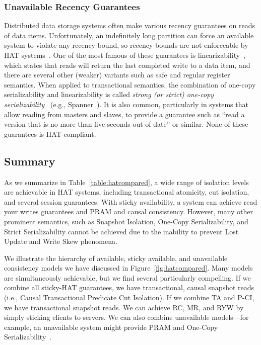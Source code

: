 \subsubsection{Unavailable Recency Guarantees}

Distributed data storage systems often make various recency guarantees
on reads of data items.  Unfortunately, an indefinitely long partition
can force an available system to violate any recency bound, so recency
bounds are not enforceable by HAT systems~\cite{gilbert-cap}. One of
the most famous of these guarantees is
linearizability~\cite{herlihy-art}, which states that reads will
return the last completed write to a data item, and there are several
other (weaker) variants such as safe and regular register
semantics. When applied to transactional semantics, the combination of
one-copy serializability and linearizability is called \textit{strong
  (or strict) one-copy serializability}~\cite{adya} (e.g.,
Spanner~\cite{spanner}). It is also common, particularly in systems
that allow reading from masters and slaves, to provide a guarantee
such as ``read a version that is no more than five seconds out of
date'' or similar. None of these guarantees is HAT-compliant.

\subsection{Summary}
\label{sec:hat-summary}

As we summarize in Table~\ref{table:hatcompared}, a wide range of
isolation levels are achievable in HAT systems, including
transactional atomicity, cut isolation, and several session
guarantees. With sticky availability, a system can achieve read your
writes guarantees and PRAM and causal consistency. However, many other
prominent semantics, such as Snapshot Isolation, One-Copy
Serializability, and Strict Serializability cannot be achieved due to
the inability to prevent Lost Update and Write Skew phenomena.

We illustrate the hierarchy of available, sticky available, and
unavailable consistency models we have discussed in
Figure~\ref{fig:hatcompared}. Many models are simultaneously
achievable, but we find several particularly compelling. If we combine
all sticky-HAT guarantees, we have transactional, causal snapshot
reads (i.e., Causal Transactional Predicate Cut Isolation). If we
combine TA and P-CI, we have transactional snapshot reads. We can
achieve RC, MR, and RYW by simply sticking clients to servers. We can
also combine unavailable models---for example, an unavailable system
might provide PRAM and One-Copy
Serializability~\cite{daudjee-session}.

